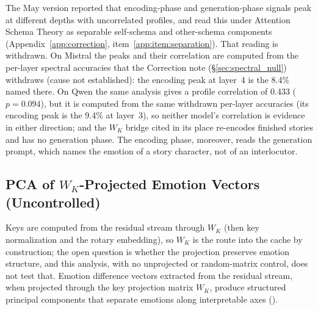 \documentclass[11pt,a4paper]{article}
\begin{document}
The May version reported that encoding-phase and generation-phase signals peak at different depths with uncorrelated profiles, and read this under Attention Schema Theory as separable self-schema and other-schema components (Appendix~\ref{app:correction}, item~\ref{app:item:separation}). That reading is withdrawn. On Mistral the peaks and their correlation are computed from the per-layer spectral accuracies that the Correction note (\S\ref{sec:spectral_null}) withdraws (cause not established): the encoding peak at layer~4 is the 8.4\% named there. On Qwen the same analysis gives a profile correlation of 0.433 ($p = 0.094$), but it is computed from the same withdrawn per-layer accuracies (its encoding peak is the 9.4\% at layer~3), so neither model's correlation is evidence in either direction; and the $W_K$ bridge cited in its place re-encodes finished stories and has no generation phase. The encoding phase, moreover, reads the generation prompt, which names the emotion of a story character, not of an interlocutor.

\subsection{PCA of $W_K$-Projected Emotion Vectors (Uncontrolled)}
\label{sec:bridge_results}

Keys are computed from the residual stream through $W_K$ (then key normalization and the rotary embedding), so $W_K$ is the route into the cache by construction; the open question is whether the projection preserves emotion structure, and this analysis, with no unprojected or random-matrix control, does not test that. Emotion difference vectors extracted from the residual stream, when projected through the key projection matrix $W_K$, produce structured principal components that separate emotions along interpretable axes ().
\end{document}

